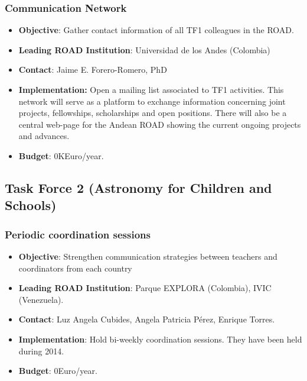 \documentclass[12pt]{article}
\begin{document}
\subsubsection{Communication Network}
\begin{itemize}
  \item{\bf Objective}: Gather contact information of all TF1 colleagues in
    the ROAD.
  \item{\bf Leading ROAD Institution}: Universidad de los Andes (Colombia)
  \item{\bf Contact}: Jaime E. Forero-Romero, PhD
  \item{\bf Implementation:} Open a mailing list associated to TF1
    activities. This network will serve as a platform to exchange
    information concerning joint projects, fellowships, scholarships
    and open positions. There will also be a central web-page for the
    Andean ROAD showing the current ongoing projects and advances.
  \item{\bf Budget}: 0KEuro/year.
\end{itemize}


\subsection{Task Force 2 (Astronomy for Children and Schools)}


\subsubsection{Periodic coordination sessions}

\begin{itemize}

\item{\bf Objective}: Strengthen communication  strategies between
  teachers  and coordinators from each  country
\item{\bf Leading ROAD Institution}: Parque EXPLORA (Colombia), IVIC
  (Venezuela). 
\item{\bf Contact}: Luz Angela Cubides,  Angela Patricia  P\'erez,
  Enrique  Torres.
\item{\bf Implementation}: Hold bi-weekly coordination sessions. They
  have been held during 2014.
\item{\bf Budget}: 0Euro/year.
\end{itemize}
\end{document}
